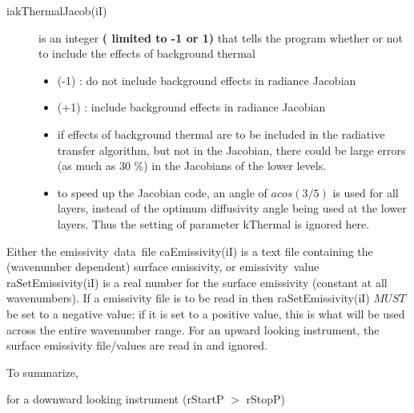 \documentclass[12pt]{article}
\begin{document}
{\begin{description}
\item[{\sf iakThermalJacob(iI)}] is an integer {\bf( limited to -1 or 1)} that 
tells the program whether or not to include the effects of background thermal
\begin{itemize}
\item (-1) : do not include background effects in radiance Jacobian
\item (+1) : include background effects in radiance Jacobian
\item if effects of background thermal are to be included in the
  radiative transfer algorithm, but not in the Jacobian, there could
  be large errors (as much as 30 \%) in the Jacobians of the lower
  levels.
\item to speed up the Jacobian code, an angle of $acos(3/5)$ is used
  for all layers, instead of the optimum diffusivity angle being used
  at the lower layers.  Thus the setting of parameter {\sf kThermal}
  is ignored here.
\end{itemize} 
\end{description}

Either the {\sf emissivity~data~file caEmissivity(iI)} is a text file 
containing the (wavenumber dependent) surface emissivity, or {\sf 
emissivity~value raSetEmissivity(iI)} is a real number for the surface 
emissivity (constant at all wavenumbers). If a emissivity file is to be read
in then raSetEmissivity(iI) $MUST$ be set to a negative value; if it is set
to a positive value, this is what will be used across the entire wavenumber
range. For an upward looking instrument, the surface
emissivity file/values are read in and ignored.  

To summarize,

\medskip
\noindent for a downward looking instrument (rStartP $>$ rStopP)

}
\end{document}
